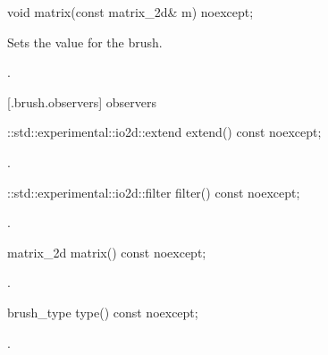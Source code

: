 \begin{itemdecl}
    void matrix(const matrix_2d& m) noexcept;
\end{itemdecl}
\begin{itemdescr}
	\pnum
	\effects
	Sets the  value for the brush.
	
	\pnum
	\postconditions
	.
	
\end{itemdescr}

 [\iotwod.brush.observers]{ observers}

\begin{itemdecl}
    ::std::experimental::io2d::extend extend() const noexcept;
\end{itemdecl}
\begin{itemdescr}
	\pnum
	\returns
	.

\end{itemdescr}

\begin{itemdecl}
    ::std::experimental::io2d::filter filter() const noexcept;
\end{itemdecl}
\begin{itemdescr}
	\pnum
	\returns
	.

\end{itemdescr}

\begin{itemdecl}
    matrix_2d matrix() const noexcept;
\end{itemdecl}
\begin{itemdescr}
	\pnum
	\returns
	.

\end{itemdescr}

\begin{itemdecl}
    brush_type type() const noexcept;
\end{itemdecl}
\begin{itemdescr}
	\pnum
	\returns
	.

\end{itemdescr}
